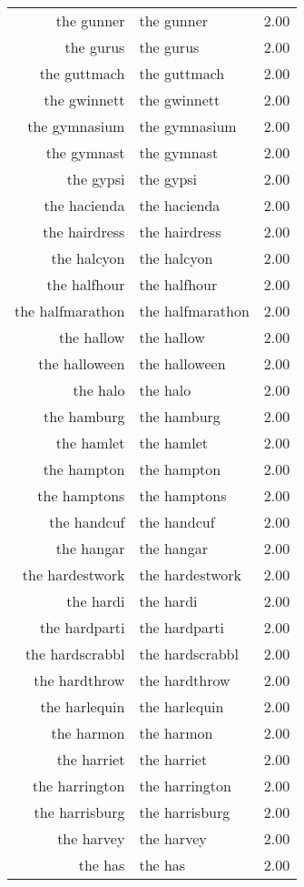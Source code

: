\begin{table}[ht]
\begin{tabular}{rlr}
  the gunner & the gunner & 2.00 \\ 
  the gurus & the gurus & 2.00 \\ 
  the guttmach & the guttmach & 2.00 \\ 
  the gwinnett & the gwinnett & 2.00 \\ 
  the gymnasium & the gymnasium & 2.00 \\ 
  the gymnast & the gymnast & 2.00 \\ 
  the gypsi & the gypsi & 2.00 \\ 
  the hacienda & the hacienda & 2.00 \\ 
  the hairdress & the hairdress & 2.00 \\ 
  the halcyon & the halcyon & 2.00 \\ 
  the halfhour & the halfhour & 2.00 \\ 
  the halfmarathon & the halfmarathon & 2.00 \\ 
  the hallow & the hallow & 2.00 \\ 
  the halloween & the halloween & 2.00 \\ 
  the halo & the halo & 2.00 \\ 
  the hamburg & the hamburg & 2.00 \\ 
  the hamlet & the hamlet & 2.00 \\ 
  the hampton & the hampton & 2.00 \\ 
  the hamptons & the hamptons & 2.00 \\ 
  the handcuf & the handcuf & 2.00 \\ 
  the hangar & the hangar & 2.00 \\ 
  the hardestwork & the hardestwork & 2.00 \\ 
  the hardi & the hardi & 2.00 \\ 
  the hardparti & the hardparti & 2.00 \\ 
  the hardscrabbl & the hardscrabbl & 2.00 \\ 
  the hardthrow & the hardthrow & 2.00 \\ 
  the harlequin & the harlequin & 2.00 \\ 
  the harmon & the harmon & 2.00 \\ 
  the harriet & the harriet & 2.00 \\ 
  the harrington & the harrington & 2.00 \\ 
  the harrisburg & the harrisburg & 2.00 \\ 
  the harvey & the harvey & 2.00 \\ 
  the has & the has & 2.00 \\ 

\end{tabular}
\end{table}
